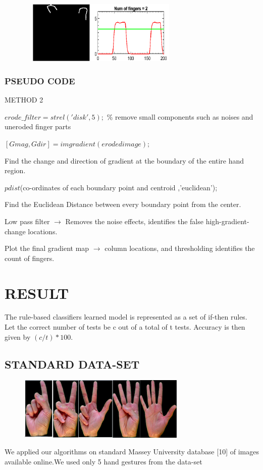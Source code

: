 \documentclass[conference]{IEEEtran}
\begin{document}
\begin{figure}[h!]
	\centering
	\includegraphics[width = 8cm, height = 3cm]{fin2m2}
\end{figure}

\subsubsection{PSEUDO CODE}
METHOD 2

$erode\_filter= strel('disk',5);$ \% remove small components such as noises and uneroded finger parts
 
$[Gmag, Gdir] = imgradient(eroded image); $

Find the change and direction of gradient at the boundary of the entire hand region. 

$pdist$(co-ordinates of each boundary point and centroid ,'euclidean');

Find the Euclidean Distance between every boundary point from the center.

Low pass filter $\rightarrow$ Removes the noise effects, identifies the false high-gradient-change locations.

Plot the final gradient map $\rightarrow$ column locations, and thresholding identifies the count of fingers.

\section{RESULT}
The rule-based classifiers learned model is represented as a set of if-then rules. Let the correct number of tests be c out of a total of t tests.
Accuracy is then given by $(c/t)*100$.

\subsection{STANDARD DATA-SET}
\begin{figure}[h!]
	\centering
	\includegraphics[width = 8cm, height = 3cm]{StandardDataset1}
\end{figure}
We applied our algorithms on standard Massey University database [10] of images available online.We used only 5 hand gestures from the data-set
\end{document}

